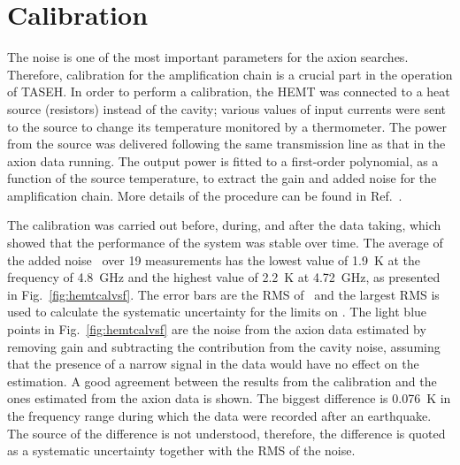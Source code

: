 \section{Calibration} \label{sec:hemtcalibration}
\label{sec:calibration}

The noise is one of the most important parameters for the axion searches. 
Therefore, calibration for the amplification chain is a 
crucial part in the operation of TASEH. In order to perform a calibration, 
the HEMT was connected to a heat source (resistors) instead of the cavity; 
various values of input currents were sent to the source to change its 
temperature monitored by a thermometer. The power from the source 
was delivered following the same transmission line as that in the axion 
data running. 
The output power is fitted to a first-order polynomial, as a function of 
the source temperature, to extract the gain and added noise for the 
amplification chain. More details of the 
procedure can be found in Ref.~\cite{TASEHInstrumentation}. 

The calibration was carried out before, during, and after the data taking, 
which showed that the performance of the system was stable over time. The 
average of the added noise \ta\ over 19 measurements has the lowest value of 
1.9~K at the frequency of 4.8~GHz and the highest value of 
2.2~K at 4.72~GHz, as presented in Fig.~\ref{fig:hemtcalvsf}. 
The error bars are the RMS of \ta\ and the largest RMS is used to calculate 
the systematic uncertainty for the limits on \gagg. The light blue points in 
Fig.~\ref{fig:hemtcalvsf} are the noise from the axion data estimated by 
removing gain and subtracting the contribution from the cavity noise, assuming 
that the presence of a narrow signal in the data would have no effect on the 
estimation. A good agreement between the results from the calibration  
and the ones estimated from the axion data is shown. The biggest 
difference is 0.076~K in the frequency range during which the data were 
recorded after an earthquake. The source of the difference is not understood, 
therefore, the difference is quoted as a systematic uncertainty together 
with the RMS of the noise.

